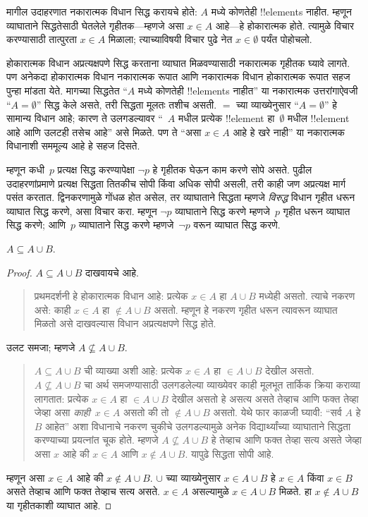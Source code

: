 \documentclass[../../../include/open-logic-section]{subfiles}
\begin{document}
मागील उदाहरणात नकारात्मक विधान सिद्ध करायचे होते: $A$ मध्ये कोणतेही !!{element}s नाहीत. म्हणून व्याघाताने सिद्धतेसाठी घेतलेले गृहीतक---म्हणजे असा $x \in A$ आहे---हे होकारात्मक होते. त्यामुळे विचार करण्यासाठी तात्पुरता $x \in A$ मिळाला; त्याच्याविषयी विचार पुढे नेत $x \in \emptyset$ पर्यंत पोहोचलो.

होकारात्मक विधान अप्रत्यक्षपणे सिद्ध करताना व्याघात मिळवण्यासाठी नकारात्मक गृहीतक घ्यावे लागते. पण अनेकदा होकारात्मक विधान नकारात्मक रूपात आणि नकारात्मक विधान होकारात्मक रूपात सहज पुन्हा मांडता येते. मागच्या सिद्धतेत “$A$ मध्ये कोणतेही !!{element}s नाहीत” या नकारात्मक उत्तरांगाऐवजी “$A = \emptyset$” सिद्ध केले असते, तरी सिद्धता मूलतः तशीच असती. $=$ च्या व्याख्येनुसार “$A = \emptyset$” हे सामान्य विधान आहे; कारण ते उलगडल्यावर “~$A$ मधील प्रत्येक !!{element} हा~$\emptyset$ मधील !!{element} आहे आणि उलटही तसेच आहे” असे मिळते. पण ते “असा $x \in A$ आहे हे खरे नाही” या नकारात्मक विधानाशी सममूल्य आहे हे सहज दिसते.

म्हणून कधी~$p$ प्रत्यक्ष सिद्ध करण्यापेक्षा $\lnot p$ हे गृहीतक घेऊन काम करणे सोपे असते. पुढील उदाहरणांप्रमाणे प्रत्यक्ष सिद्धता तितकीच सोपी किंवा अधिक सोपी असली, तरी काही जण अप्रत्यक्ष मार्ग पसंत करतात. द्विनकरणामुळे गोंधळ होत असेल, तर व्याघाताने सिद्धता म्हणजे \emph{विरुद्ध} विधान गृहीत धरून व्याघात सिद्ध करणे, असा विचार करा. म्हणून $\lnot p$ व्याघाताने सिद्ध करणे म्हणजे~$p$ गृहीत धरून व्याघात सिद्ध करणे; आणि~$p$ व्याघाताने सिद्ध करणे म्हणजे~$\lnot p$ वरून व्याघात सिद्ध करणे.

\begin{prop}
$A \subseteq A \cup B$.
\end{prop}

\begin{proof}
$A \subseteq A \cup B$ दाखवायचे आहे.
\begin{quote}
प्रथमदर्शनी हे होकारात्मक विधान आहे: प्रत्येक $x \in A$ हा $A \cup B$ मध्येही असतो. त्याचे नकरण असे: काही $x \in A$ हा $\notin A \cup B$ असतो. म्हणून हे नकरण गृहीत धरून त्यावरून व्याघात मिळतो असे दाखवल्यास विधान अप्रत्यक्षपणे सिद्ध होते.
\end{quote}
उलट समजा; म्हणजे $A \nsubseteq A \cup B$.
\begin{quote}
$A \subseteq A \cup B$ ची व्याख्या अशी आहे: प्रत्येक $x \in A$ हा $\in A \cup B$ देखील असतो. $A \nsubseteq A \cup B$ चा अर्थ समजण्यासाठी उलगडलेल्या व्याख्येवर काही मूलभूत तार्किक क्रिया कराव्या लागतात: प्रत्येक $x \in A$ हा $\in A \cup B$ देखील असतो हे असत्य असते तेव्हाच आणि फक्त तेव्हा जेव्हा असा \emph{काही}~$x \in A$ असतो की तो $\notin A \cup B$ असतो. येथे फार काळजी घ्यावी: “सर्व $A$ हे $B$ आहेत” अशा विधानाचे नकरण चुकीचे उलगडल्यामुळे अनेक विद्यार्थ्यांच्या व्याघाताने सिद्धता करण्याच्या प्रयत्नांत चूक होते. म्हणजे $A \nsubseteq A \cup B$ हे तेव्हाच आणि फक्त तेव्हा सत्य असते जेव्हा असा $x$ आहे की $x \in A$ आणि $x \notin A \cup B$. यापुढे सिद्धता सोपी आहे.
\end{quote}
म्हणून असा $x \in A$ आहे की $x \notin A \cup B$. $\cup$ च्या व्याख्येनुसार $x \in A \cup B$ हे $x \in A$ किंवा $x \in B$ असते तेव्हाच आणि फक्त तेव्हाच सत्य असते. $x \in A$ असल्यामुळे $x \in A \cup B$ मिळते. हा $x \notin A \cup B$ या गृहीतकाशी व्याघात आहे.
\end{proof}
\end{document}
